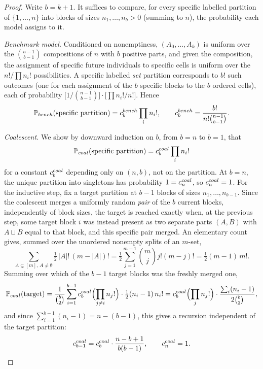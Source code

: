 \documentclass[10pt,a4paper]{amsart}
\newcommand{\PP}{\mathbb{P}}
\begin{document}
\begin{proof}
Write \(b=k+1\). It suffices to compare, for every specific labelled partition of \(\{1,\ldots,n\}\) into blocks of sizes \(n_1,\ldots,n_b>0\) (summing to \(n\)), the probability each model assigns to it.

\emph{Benchmark model.} Conditioned on nonemptiness, \((A_0,\ldots,A_k)\) is uniform over the \(\binom{n-1}{b-1}\)  compositions of \(n\) with \(b\) positive parts, and given the composition, the assignment of specific future individuals to specific cells is uniform over the \(n!/\prod n_i!\) possibilities. A specific labelled \emph{set} partition corresponds to \(b!\) such outcomes (one for each assignment of the \(b\) specific blocks to the \(b\) ordered cells), each of probability \(\bigl[1/\binom{n-1}{b-1}\bigr]\cdot\bigl[\prod n_i!/n!\bigr]\). Hence
\begin{equation}
\label{eq:cbench}
\PP_{\rm bench}(\text{specific partition})=c_b^{\rm bench}\prod_i n_i!,\qquad
c_b^{\rm bench}=\frac{b!}{n!\binom{n-1}{b-1}}.
\end{equation}

\emph{Coalescent.} We show by downward induction on \(b\), from \(b=n\) to \(b=1\), that 
$$\PP_{\rm coal}(\text{specific partition})=c_b^{\rm coal}\prod_i n_i!$$
for a constant \(c_b^{\rm coal}\) depending only on \((n,b)\), not on the partition. At \(b=n\), the unique partition into singletons has probability \(1=c_n^{\rm coal}\), so \(c_n^{\rm coal}=1\). For the inductive step, fix a target partition at \(b-1\) blocks of sizes \(n_1,\ldots,n_{b-1}\). Since the coalescent merges a uniformly random \emph{pair} of the \(b\) current blocks, independently of block sizes, the target is reached exactly when, at the previous step, some target block \(i\) was instead present as two separate parts \((A,B)\) with \(A\sqcup B\) equal to that block, and this specific pair merged. An elementary count gives, summed over the unordered nonempty splits of an \(m\)-set,
\[
\sum_{A\subsetneq[m],\,A\ne\emptyset}\tfrac12\,|A|!\,(m-|A|)!=\tfrac12\sum_{j=1}^{m-1}\binom mj j!(m-j)!=\tfrac12(m-1)\,m!.
\]
Summing over which of the \(b-1\) target blocks was the freshly merged one,
\[
\PP_{\rm coal}(\text{target})=\frac1{\binom b2}\sum_{i=1}^{b-1}c_b^{\rm coal}\Bigl(\prod_{j\ne i}n_j!\Bigr)\cdot\tfrac12(n_i-1)\,n_i!
=c_b^{\rm coal}\Bigl(\prod_jn_j!\Bigr)\cdot\frac{\sum_i(n_i-1)}{2\binom b2},
\]
and since \(\sum_{i=1}^{b-1}(n_i-1)=n-(b-1)\), this gives a recursion independent of the target partition:
\begin{equation}
\label{eq:crecur}
c_{b-1}^{\rm coal}=c_b^{\rm coal}\cdot\frac{n-b+1}{b(b-1)},\qquad c_n^{\rm coal}=1.
\end{equation}


\end{proof}
\end{document}
